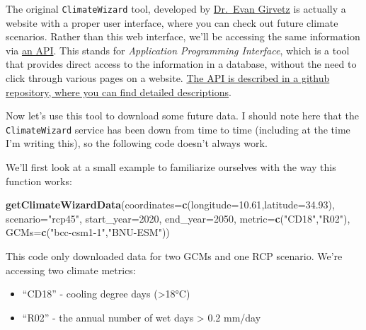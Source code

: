 \documentclass[
]{book}
\newenvironment{Shaded}{\begin{snugshade}}{\end{snugshade}}
\newcommand{\DataTypeTok}[1]{\textcolor[rgb]{0.13,0.29,0.53}{#1}}
\newcommand{\DecValTok}[1]{\textcolor[rgb]{0.00,0.00,0.81}{#1}}
\newcommand{\FloatTok}[1]{\textcolor[rgb]{0.00,0.00,0.81}{#1}}
\newcommand{\KeywordTok}[1]{\textcolor[rgb]{0.13,0.29,0.53}{\textbf{#1}}}
\newcommand{\NormalTok}[1]{#1}
\newcommand{\StringTok}[1]{\textcolor[rgb]{0.31,0.60,0.02}{#1}}
\providecommand{\tightlist}{%
  \setlength{\itemsep}{0pt}\setlength{\parskip}{0pt}}
\begin{document}
The original \texttt{ClimateWizard} tool, developed by \href{https://scholar.google.de/citations?user=Yh2sQY4AAAAJ\&hl=de}{Dr.~Evan Girvetz} is actually a website with a proper user interface, where you can check out future climate scenarios. Rather than this web interface, we'll be accessing the same information via \href{http://climatewizard.ccafs-climate.org/service?lat=9.58\&lon=-74.41\&index=CDD\&scenario=rcp45\&gcm=ACCESS1-0\&range=2041-2060\&baseline=1980-2000\&avg=true}{an API}. This stands for \emph{Application Programming Interface}, which is a tool that provides direct access to the information in a database, without the need to click through various pages on a website. \href{https://github.com/CIAT-DAPA/climate_wizard_api}{The API is described in a github repository, where you can find detailed descriptions}.

Now let's use this tool to download some future data. I should note here that the \texttt{ClimateWizard} service has been down from time to time (including at the time I'm writing this), so the following code doesn't always work.

We'll first look at a small example to familiarize ourselves with the way this function works:

\begin{Shaded}
\begin{Highlighting}[]
\KeywordTok{getClimateWizardData}\NormalTok{(}\DataTypeTok{coordinates=}\KeywordTok{c}\NormalTok{(}\DataTypeTok{longitude=}\FloatTok{10.61}\NormalTok{,}\DataTypeTok{latitude=}\FloatTok{34.93}\NormalTok{),}
   \DataTypeTok{scenario=}\StringTok{"rcp45"}\NormalTok{, }\DataTypeTok{start_year=}\DecValTok{2020}\NormalTok{, }\DataTypeTok{end_year=}\DecValTok{2050}\NormalTok{,}
   \DataTypeTok{metric=}\KeywordTok{c}\NormalTok{(}\StringTok{"CD18"}\NormalTok{,}\StringTok{"R02"}\NormalTok{), }\DataTypeTok{GCMs=}\KeywordTok{c}\NormalTok{(}\StringTok{"bcc-csm1-1"}\NormalTok{,}\StringTok{"BNU-ESM"}\NormalTok{))}
\end{Highlighting}
\end{Shaded}

This code only downloaded data for two GCMs and one RCP scenario. We're accessing two climate metrics:

\begin{itemize}
\tightlist
\item
  ``CD18'' - cooling degree days (\textgreater18°C)
\item
  ``R02'' - the annual number of wet days \textgreater{} 0.2 mm/day
\end{itemize}
\end{document}
